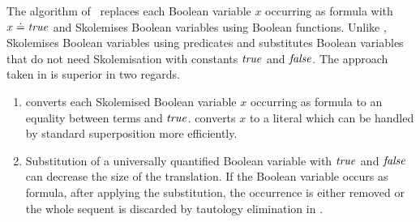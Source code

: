 The \oldcnf{} algorithm of~\cite{FOOL} 
replaces each Boolean variable $x$ occurring as formula with $x \doteq \mathit{true}$ and Skolemises Boolean variables using Boolean \Skolem{} functions. 
Unlike \oldcnf{}, \nfcnf{} Skolemises Boolean variables using \Skolem{} predicates and substitutes Boolean variables that do not need Skolemisation with constants $\mathit{true}$ and $\mathit{false}$. 
The approach taken in \nfcnf{} is superior in two regards.
\begin{enumerate}
  \item \oldcnf{} converts each Skolemised Boolean variable $x$ occurring as formula to an equality between \Skolem{} terms and $\mathit{true}$. \nfcnf{} converts $x$ to a \Skolem{} literal which can be handled by standard superposition more efficiently. 
  \item Substitution of a universally quantified Boolean variable with $\mathit{true}$ and $\mathit{false}$ can decrease the size of the translation. If the Boolean variable occurs as formula, after applying the substitution,  the occurrence is either removed or the whole sequent is discarded by tautology elimination in \nfcnf{}.
\end{enumerate}



